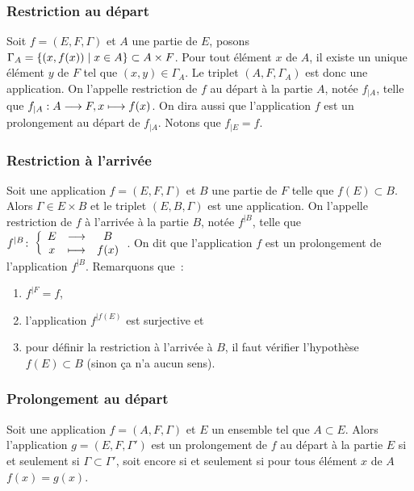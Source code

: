 \subsubsection{Restriction au départ} 
\label{chap3-subsubsec:restrictiondep}

Soit \(f=(E,F,\Gamma)\) et \(A\) une partie de \(E\), posons 
\(\Gamma_A=\left\{(x,f(x))\mathrel{}\middle|\mathrel{}x \in A\right\} \subset A \times F\). Pour tout élément 
\(x\) de \(A\), il existe un unique élément \(y\) de \(F\) tel que \((x,y) \in 
\Gamma_A\). Le triplet \((A,F, \Gamma_A)\) est donc une application. On 
l'appelle restriction de \(f\) au départ à la partie \(A\), notée \(f_{|A}\), 
telle que \(f_{|A}:A \longrightarrow F, x \longmapsto f(x)\). On dira aussi que l'application 
\(f\) est un prolongement au départ de \(f_{|A}\). Notons que \(f_{|E}=f\).

\subsubsection{Restriction à l'arrivée}
\label{chap3-subsubsec:restrictionarr}

Soit une application \(f=(E,F,\Gamma)\) et \(B\) une partie de \(F\) telle que 
\(f(E) \subset B\). Alors \(\Gamma \in E \times B\) et le triplet 
\((E,B,\Gamma)\) est une application. On l'appelle restriction de \(f\) à 
l'arrivée à la partie \(B\), notée \(f^{|B}\), telle que 
\(f^{|B}\colon \left\{\begin{array}{ccc} E & \longrightarrow &B\\ x & \longmapsto & f(x) \end{array} \right.\). On dit que l'application \(f\) est un 
prolongement de l'application \(f^{|B}\). Remarquons que~:

\begin{enumerate}
    \item \(f^{|F}=f\), 
    \item l'application \(f^{|f(E)}\) est surjective et 
    \item pour définir la restriction à l'arrivée à \(B\), il faut vérifier 
        l'hypothèse \(f(E) \subset B\) (sinon ça n'a aucun sens).
\end{enumerate}

\subsubsection{Prolongement au départ}
\label{chap3-subsubsec:prolongementdep}

Soit une application \(f=(A,F,\Gamma)\) et \(E\) un ensemble tel que \(A \subset 
E\). Alors l'application \(g=(E,F,\Gamma')\) est un prolongement de \(f\) au 
départ à la partie \(E\) si et seulement si \(\Gamma \subset \Gamma'\), soit 
encore si et seulement si pour tous élément \(x\) de \(A\) \(f(x)=g(x)\).

